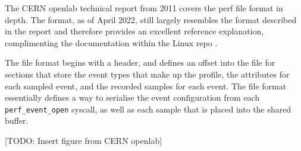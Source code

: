 The CERN openlab technical report from 2011 \cite{CERN_openlab_perf_file_format} covers the perf file format in depth. The format, as of April 2022, still largely resembles the format described in the report and therefore provides an excellent reference explanation, complimenting the documentation within the Linux repo \cite{GithubPerfFileFormat}.

The file format begins with a header, and defines an offset into the file for sections that store the event types that make up the profile, the attributes for each sampled event, and the recorded samples for each event. The file format essentially defines a way to serialise the event configuration from each \texttt{perf\_event\_open} syscall, as well as each sample that is placed into the shared buffer. 

[TODO: Insert figure from CERN openlab]
